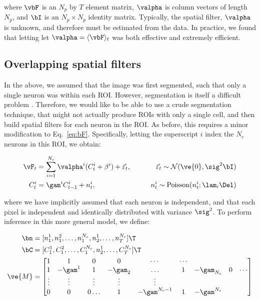 \noindent where $\vbF$ is an $N_p$ by $T$ element matrix, $\valpha$ is column vectors of length $N_p$, and $\bI$ is an $N_p \times N_p$ identity matrix.  Typically, the spatial filter, $\valpha$ is unknown, and therefore must be estimated from the data.  In practice, we found that letting let $\valpha=\langle \vbF \rangle_t$ was both effective and extremely efficient.




\subsection{Overlapping spatial filters}

In the above, we assumed that the image was first segmented, such that only a single neuron was within each ROI.  However, segmentation is itself a difficult problem \cite{}.  Therefore, we would like to be able to use a crude segmentation technique, that might not actually produce ROIs with only a single cell, and then build spatial filters for each neuron in the ROI.  As before, this requires a minor modification to Eq.~\eqref{eq:bF}.  Specifically, letting the superscript $i$ index the $N_c$ neurons in this ROI, we obtain:  

\begin{align}
\vF_t &= \sum_{i=1}^{N_c}\valpha^i (C^i_t + \beta^i) +  \vec{\varepsilon}_t, \qquad &\vec{\varepsilon}_t \sim \mathcal{N}(\ve{0},\sig^2 \bI)   \\
C^i_t &= \gam^i C^i_{t-1} + n^i_t, & n^i_t \sim \text{Poisson}(n^i_t; \lam_i \Del)
\end{align}

\noindent where we have implicitly assumed that each neuron is independent, and that each pixel is independent and identically distributed with variance $\sig^2$.  To perform inference in this more general model, we define:

\begin{align} \label{eq:M2}
\bn &=  [n^1_1, n^2_1, \ldots, n^{N_c}_1, n^1_2, \ldots, n^{N_c}_T]\T \\
\bC &=  [C^1_1, C^2_1, \ldots, C^{N_c}_1, n^1_2, \ldots, C^{N_c}_T]\T \\
\ve{M} &= %
\begin{bmatrix}
1 & 1 & 0 & 0 & \cdots & \cdots \\
1 & -\gam^1 & 1 & -\gam_2 & \ldots & 1 & -\gam_{N_c}  & 0 & \cdots \\
\vdots & \vdots & \vdots & \vdots & \vdots  \\
0 & 0 & 0 \ldots & 1 & -\gam^{N_c-1} & 1 & -\gam^{N_c}
\end{bmatrix}
\end{align} 


